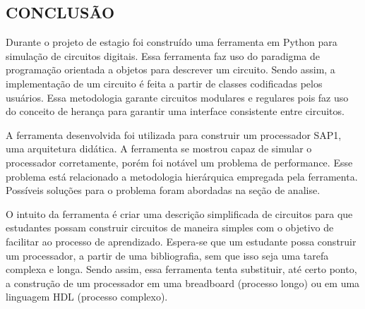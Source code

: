 \subsection{CONCLUSÃO}
Durante o projeto de estagio foi construído uma ferramenta em Python para simulação de circuitos digitais.
Essa ferramenta faz uso do paradigma de programação orientada a objetos para descrever um circuito.
Sendo assim, a implementação de um circuito é feita a partir de classes codificadas pelos usuários.
Essa metodologia garante circuitos modulares e regulares pois faz uso do conceito de herança para garantir uma interface consistente entre circuitos.

A ferramenta desenvolvida foi utilizada para construir um processador SAP1, uma arquitetura didática.
A ferramenta se mostrou capaz de simular o processador corretamente, porém foi notável um problema de performance.
Esse problema está relacionado a metodologia hierárquica empregada pela ferramenta.
Possíveis soluções para o problema foram abordadas na seção de analise.

O intuito da ferramenta é criar uma descrição simplificada de circuitos para que estudantes possam construir circuitos de maneira simples com o objetivo de facilitar ao processo de aprendizado.
Espera-se que um estudante possa construir um processador, a partir de uma bibliografia, sem que isso seja uma tarefa complexa e longa.
Sendo assim, essa ferramenta tenta substituir, até certo ponto, a construção de um processador em uma breadboard (processo longo) ou em uma linguagem HDL (processo complexo).
